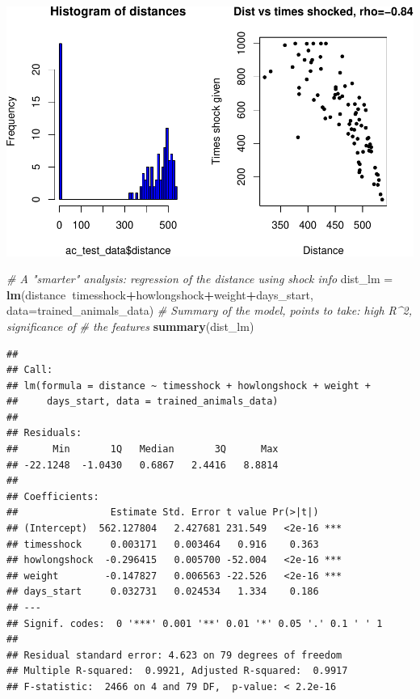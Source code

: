 \documentclass[]{article}
\newenvironment{Shaded}{\begin{snugshade}}{\end{snugshade}}
\newcommand{\KeywordTok}[1]{\textcolor[rgb]{0.13,0.29,0.53}{\textbf{#1}}}
\newcommand{\DataTypeTok}[1]{\textcolor[rgb]{0.13,0.29,0.53}{#1}}
\newcommand{\StringTok}[1]{\textcolor[rgb]{0.31,0.60,0.02}{#1}}
\newcommand{\CommentTok}[1]{\textcolor[rgb]{0.56,0.35,0.01}{\textit{#1}}}
\newcommand{\OperatorTok}[1]{\textcolor[rgb]{0.81,0.36,0.00}{\textbf{#1}}}
\newcommand{\NormalTok}[1]{#1}
\begin{document}
\begin{center}\includegraphics[width=0.6\linewidth,height=0.6\textheight]{pheno_csv_files_analysis_files/figure-latex/unnamed-chunk-3-1} \end{center}

\begin{Shaded}
\begin{Highlighting}[]
\CommentTok{# A "smarter" analysis: regression of the distance using shock info}
\NormalTok{dist_lm  =}\StringTok{ }\KeywordTok{lm}\NormalTok{(distance}\OperatorTok{~}\NormalTok{timesshock}\OperatorTok{+}\NormalTok{howlongshock}\OperatorTok{+}\NormalTok{weight}\OperatorTok{+}\NormalTok{days_start,}
              \DataTypeTok{data=}\NormalTok{trained_animals_data)}
\CommentTok{# Summary of the model, points to take: high R^2, significance of}
\CommentTok{# the features}
\KeywordTok{summary}\NormalTok{(dist_lm)}
\end{Highlighting}
\end{Shaded}

\begin{verbatim}
## 
## Call:
## lm(formula = distance ~ timesshock + howlongshock + weight + 
##     days_start, data = trained_animals_data)
## 
## Residuals:
##      Min       1Q   Median       3Q      Max 
## -22.1248  -1.0430   0.6867   2.4416   8.8814 
## 
## Coefficients:
##                Estimate Std. Error t value Pr(>|t|)    
## (Intercept)  562.127804   2.427681 231.549   <2e-16 ***
## timesshock     0.003171   0.003464   0.916    0.363    
## howlongshock  -0.296415   0.005700 -52.004   <2e-16 ***
## weight        -0.147827   0.006563 -22.526   <2e-16 ***
## days_start     0.032731   0.024534   1.334    0.186    
## ---
## Signif. codes:  0 '***' 0.001 '**' 0.01 '*' 0.05 '.' 0.1 ' ' 1
## 
## Residual standard error: 4.623 on 79 degrees of freedom
## Multiple R-squared:  0.9921, Adjusted R-squared:  0.9917 
## F-statistic:  2466 on 4 and 79 DF,  p-value: < 2.2e-16
\end{verbatim}
\end{document}
